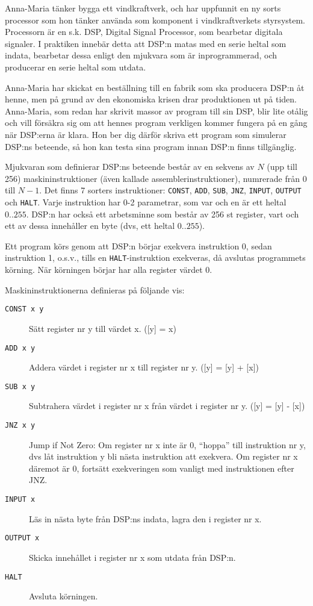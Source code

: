 
Anna-Maria tänker bygga ett vindkraftverk, och har uppfunnit en ny sorts processor som hon tänker använda som komponent i vindkraftverkets styrsystem. Processorn är en s.k. DSP, Digital Signal Processor, som bearbetar digitala signaler. I praktiken innebär detta att DSP:n matas med en serie heltal som indata, bearbetar dessa enligt den mjukvara som är inprogrammerad, och producerar en serie heltal som utdata.

Anna-Maria har skickat en beställning till en fabrik som ska producera DSP:n åt henne, men på grund av den ekonomiska krisen drar produktionen ut på tiden. Anna-Maria, som redan har skrivit massor av program till sin DSP, blir lite otålig och vill försäkra sig om att hennes program verkligen kommer fungera på en gång när DSP:erna är klara. Hon ber dig därför skriva ett program som simulerar DSP:ns beteende, så hon kan testa sina program innan DSP:n finns tillgänglig.

Mjukvaran som definierar DSP:ns beteende består av en sekvens av $N$ (upp till 256) maskininstruktioner (även kallade assemblerinstruktioner), numrerade från $0$ till $N-1$. Det finns 7 sorters instruktioner: \texttt{CONST}, \texttt{ADD}, \texttt{SUB}, \texttt{JNZ}, \texttt{INPUT}, \texttt{OUTPUT} och \texttt{HALT}. Varje instruktion har 0-2 parametrar, som var och en är ett heltal $0..255$. DSP:n har också ett arbetsminne som består av 256 st register, vart och ett av dessa innehåller en byte (dvs, ett heltal $0..255$).

Ett program körs genom att DSP:n börjar exekvera instruktion 0, sedan instruktion 1, o.s.v., tills en \texttt{HALT}-instruktion exekveras, då avslutas programmets körning. När körningen börjar har alla register värdet 0. 

Maskininstruktionerna definieras på följande vis: 

\begin{description}
\item[\texttt{CONST x y}] Sätt register nr y till värdet x. ([y] = x)
\item[\texttt{ADD x y}] Addera värdet i register nr x till register nr y. ([y] = [y] + [x])
\item[\texttt{SUB x y}] Subtrahera värdet i register nr x från värdet i register nr y. ([y] = [y] - [x])
\item[\texttt{JNZ x y}] Jump if Not Zero: Om register nr x inte är 0, ``hoppa'' till instruktion nr y, dvs låt instruktion y bli nästa instruktion att exekvera. Om register nr x däremot är 0, fortsätt exekveringen som vanligt med instruktionen efter JNZ.
\item[\texttt{INPUT x}] Läs in nästa byte från DSP:ns indata, lagra den i register nr x.
\item[\texttt{OUTPUT x}] Skicka innehållet i register nr x som utdata från DSP:n.
\item[\texttt{HALT}] Avsluta körningen.
\end{description}


